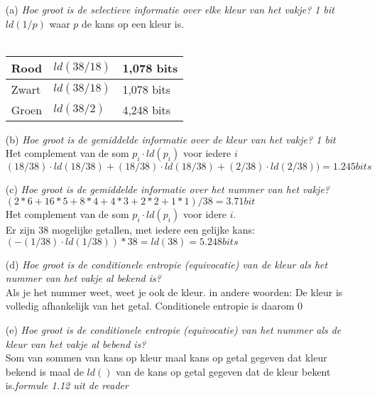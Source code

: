 \begin{itemize}
  \item[(a)] \emph{Hoe groot is de selectieve informatie over elke kleur van het vakje? \emph{1 bit}}\\
    $ld(1/p)$ waar $p$ de kans op een kleur is.\\\\
    \begin{tabular}{|l|l||l|}\hline
      Rood & $ld(38/18)$ & 1,078 bits \\\hline
      Zwart & $ld(38/18)$ & 1,078 bits \\\hline
      Groen & $ld(38/2)$ & 4,248 bits \\\hline
    \end{tabular}

  \item[(b)] \emph{Hoe groot is de gemiddelde informatie over de kleur van het vakje? \emph{1 bit}}\\
    Het complement van de som $p_i \cdot ld(p_i)$ voor iedere $i$\\
    
    $(18/38) \cdot ld(18/38) + (18/38) \cdot ld(18/38) + (2/38) \cdot ld(2/38)) = 1.245 bits$
    
  \item[(c)] \emph{Hoe groot is de gemiddelde informatie over het nummer van het vakje? \emph{$(2*6+16*5+8*4+4*3+2*2+1*1)/38=3.71bit$}}\\
    
    Het complement van de som $p_i \cdot ld(p_i)$ voor idere $i$.\\
    
    Er zijn 38 mogelijke getallen, met iedere een gelijke kans:
    $(-(1/38) \cdot ld(1/38))*38 = ld(38) = 5.248 bits$

  \item[(d)] \emph{Hoe groot is de conditionele entropie (equivocatie) van de kleur als het nummer van het vakje al bekend is?}\\
    
  Als je het nummer weet, weet je ook de kleur. in andere woorden: De kleur is volledig afhankelijk van het getal. Conditionele entropie is daarom $0$
    
   \item[(e)] \emph{Hoe groot is de conditionele entropie (equivocatie) van het nummer als de kleur van het vakje al bebend is?}\\
     
     Som van sommen van kans op kleur maal kans op getal gegeven dat kleur bekend is maal de $ld()$ van de kans op getal gegeven dat de kleur bekent is.\emph{formule 1.12 uit de reader}\\
     

\end{itemize}
